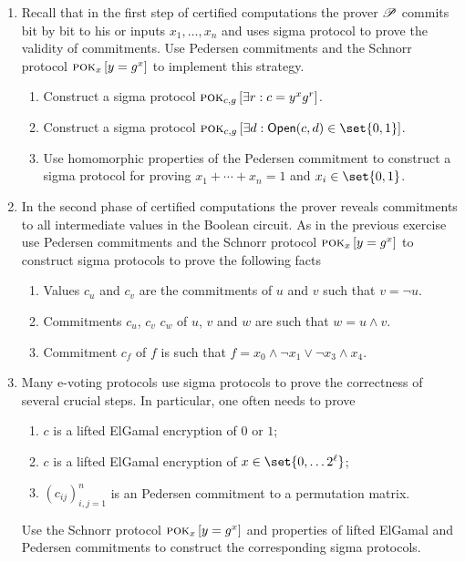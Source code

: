 \documentclass{article}
\begin{document}
\begin{enumerate}
  \addtocounter{enumi}{2}
\item Recall that in the first step of certified computations the
  prover $\mathscr{P}$ commits bit by bit to his or inputs $x_1,\ldots,
  x_n$ and uses sigma protocol to prove the validity of
  commitments. Use Pedersen commitments and the Schnorr protocol
  $\textsc{pok}_{x}\left[y=g^x\right]$ to implement this strategy.
  \begin{enumerate}
  \item Construct a sigma protocol $\textsc{pok}_{c,g}\left[\exists r: c=y^xg^r\right]$.
  \item Construct a sigma protocol $\pok{c,g}{\exists d: \OPEN(c,d)\in\set{0,1}}$.
  \item Use homomorphic properties of the Pedersen commitment to
    construct a sigma protocol for proving $x_1+\cdots+x_n=1$ and
    $x_i\in\set{0,1}$.
  \end{enumerate}

\item In the second phase of certified computations the prover reveals
  commitments to all intermediate values in the Boolean circuit. As in
  the previous exercise use Pedersen commitments and the Schnorr
  protocol $\textsc{pok}_{x}\left[y=g^x\right]$ to construct sigma protocols to prove the following facts
  \begin{enumerate}
  \item Values $c_u$ and $c_v$ are the commitments of $u$ and $v$ such that $v=\neg u$.
  \item Commitments $c_u$, $c_v$ $c_w$ of $u$, $v$ and $w$ are such that $w=u\wedge v$.
  \item Commitment $c_f$ of $f$ is such that $f=x_0\wedge \neg x_1 \vee \neg x_3\wedge x_4$. 
  \end{enumerate}

\item Many e-voting protocols use sigma protocols to prove the
  correctness of several crucial steps. In particular, one often needs
  to prove
  \begin{enumerate}
  \item $c$ is a lifted ElGamal encryption of $0$ or $1$;
  \item $c$ is a lifted ElGamal encryption of $x\in\set{0,\ldots 2^\ell}$;
  \item $(c_{ij})_{i,j=1}^n$ is an Pedersen commitment to a permutation matrix. 
  \end{enumerate}
  Use the Schnorr protocol $\textsc{pok}_{x}\left[y=g^x\right]$ and properties of lifted ElGamal
  and Pedersen commitments to construct the corresponding sigma
  protocols.



\end{enumerate}
\end{document}
